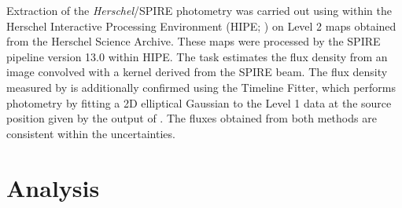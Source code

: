 \documentclass[]{emulateapj}
\begin{document}
Extraction of the {\it Herschel}/SPIRE photometry was
carried out using  within the Herschel Interactive
Processing Environment (HIPE; \citealt{Ott10a})
on Level 2 maps obtained from the Herschel Science Archive.
These maps were processed by the SPIRE pipeline
version 13.0 within HIPE. The  task estimates
the flux density from an image convolved with a kernel
derived from the SPIRE beam. The flux density
measured by  is additionally confirmed
using the Timeline Fitter, which performs photometry
by fitting a 2D elliptical Gaussian to the Level 1 data at the
source position given by the output of . The fluxes
obtained from both methods are consistent within the uncertainties.



\section{Analysis} \label{sec:anal}
%
%
\end{document}
